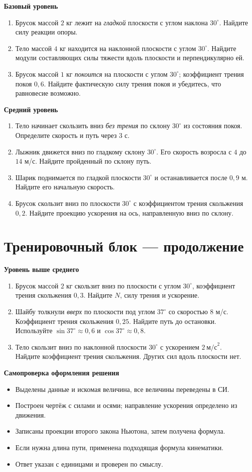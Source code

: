 \documentclass[a4paper,12pt]{article}
\newcommand{\sectionline}[1]{\section*{\textcolor{darkaccent}{#1}}}
\begin{document}
\textcolor{darkaccent}{\textbf{Базовый уровень}}
\begin{enumerate}
\item Брусок массой $2$ кг лежит на \emph{гладкой} плоскости с углом наклона $30^\circ$. Найдите силу реакции опоры.
\item Тело массой $4$ кг находится на наклонной плоскости с углом $30^\circ$. Найдите модули составляющих силы тяжести вдоль плоскости и перпендикулярно ей.
\item Брусок массой $1$ кг \emph{покоится} на плоскости с углом $30^\circ$; коэффициент трения покоя $0{,}6$. Найдите фактическую силу трения покоя и убедитесь, что равновесие возможно.
\end{enumerate}
\textcolor{darkaccent}{\textbf{Средний уровень}}
\begin{enumerate}[start=4]
\item Тело начинает скользить вниз \emph{без трения} по склону $30^\circ$ из состояния покоя. Определите скорость и путь через $3$ с.
\item Лыжник движется вниз по гладкому склону $30^\circ$. Его скорость возросла с $4$ до $14$ м/с. Найдите пройденный по склону путь.
\item Шарик поднимается по гладкой плоскости $30^\circ$ и останавливается после $0{,}9$ м. Найдите его начальную скорость.
\item Брусок скользит вниз по плоскости $30^\circ$ с коэффициентом трения скольжения $0{,}2$. Найдите проекцию ускорения на ось, направленную вниз по склону.
\end{enumerate}
\clearpage
\sectionline{Тренировочный блок — продолжение}
\textcolor{darkaccent}{\textbf{Уровень выше среднего}}
\begin{enumerate}[start=8]
\item Брусок массой $2$ кг скользит вниз по плоскости с углом $30^\circ$, коэффициент трения скольжения $0{,}3$. Найдите $N$, силу трения и ускорение.
\item Шайбу толкнули \emph{вверх} по плоскости под углом $37^\circ$ со скоростью $8$ м/с. Коэффициент трения скольжения $0{,}25$. Найдите путь до остановки. Используйте $\sin37^\circ\approx0{,}6$ и $\cos37^\circ\approx0{,}8$.
\item Тело скользит вниз по наклонной плоскости $30^\circ$ с ускорением $2\ \text{м/с}^2$. Найдите коэффициент трения скольжения. Других сил вдоль плоскости нет.
\end{enumerate}
\vspace{4mm}
\textcolor{darkaccent}{\textbf{Самопроверка оформления решения}}
\begin{itemize}
\item Выделены данные и искомая величина, все величины переведены в СИ.
\item Построен чертёж с силами и осями; направление ускорения определено из движения.
\item Записаны проекции второго закона Ньютона, затем получена формула.
\item Если нужна длина пути, применена подходящая формула кинематики.
\item Ответ указан с единицами и проверен по смыслу.
\end{itemize}
\end{document}
